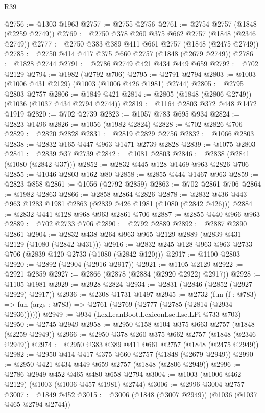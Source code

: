 \begin{lexlean}{R39}
\begin{coremodule}
@2756 := @1303 @1963
@2757 := @2755 @2756
@2761 := @2754 @2757 (@1848 (@2259 @2749))
@2769 := @2750 @378 @260 @375 @662 @2757 (@1848 (@2346 @2749))
@2777 := @2750 @383 @389 @411 @661 @2757 (@1848 (@2475 @2749))
@2785 := @2750 @414 @417 @375 @660 @2757 (@1848 (@2679 @2749))
@2786 := @1828 @2744
@2791 := @2786 @2749 @421 @434 @449 @659
@2792 := @702 @2129
@2794 := @1982 (@2792 @706)
@2795 := @2791 @2794
@2803 := @1003 (@1006 @431 @2129) (@1003 (@1006 @426 @1981) @2744)
@2805 := @2795 @2803 @2757
@2806 := @1849 @421
@2814 := @2805 (@1848 (@2806 @2749)) (@1036 (@1037 @434 @2794 @2744))
@2819 := @1164 @2803 @372 @448 @1472 @1919
@2820 := @702 @2739
@2823 := @1057 @783 @695 @934
@2824 := @2823 @1496
@2826 := @1056 (@1982 @2824)
@2828 := @702 @2826 @706
@2829 := @2820 @2828
@2831 := @2819 @2829 @2756
@2832 := @1066 @2803
@2838 := @2832 @165 @447 @963 @1471 @2739 @2828
@2839 := @1075 @2803
@2841 := @2839 @37 @2739
@2842 := @1081 @2803
@2846 := @2838 (@2841 (@1080 (@2842 @37)))
@2852 := @2832 @445 @128 @1469 @963 @2826 @706
@2855 := @1046 @2803 @162 @80
@2858 := @2855 @444 @1467 @963
@2859 := @2823 @858
@2861 := @1056 (@2792 @2859)
@2863 := @702 @2861 @706
@2864 := @1982 @2863
@2866 := @2858 @2864 @2826
@2878 := @2832 @436 @443 @963 @1283 @1981 @2863 (@2839 @426 @1981 (@1080 (@2842 @426)))
@2884 := @2832 @441 @128 @968 @963 @2861 @706
@2887 := @2855 @440 @966 @963
@2889 := @702 @2733 @706
@2890 := @2792 @2889
@2892 := @2887 @2890 @2861
@2904 := @2832 @438 @264 @963 @965 @2129 @2889 (@2839 @431 @2129 (@1080 (@2842 @431)))
@2916 := @2832 @245 @128 @963 @963 @2733 @706 (@2839 @120 @2733 (@1080 (@2842 @120)))
@2917 := @1100 @2803
@2920 := @2892 (@2904 (@2916 @2917))
@2921 := @1105 @2129
@2922 := @2921 @2859
@2927 := @2866 (@2878 (@2884 (@2920 @2922) @2917))
@2928 := @1105 @1981
@2929 := @2928 @2824
@2934 := @2831 (@2846 (@2852 (@2927 @2929) @2917))
@2936 := @2308 @1731 @1497
@2945 := @2732
    (fun (f : @783) => fun (args : @783) => @2761 (@2769 (@2777 (@2785 (@2814 (@2934 @2936))))))
@2949 := @934 (LexLeanBoot.LexiconLse.Lse.LPi @733 @703)
@2950 := @2745 @2949
@2958 := @2950 @158 @104 @375 @663 @2757 (@1848 (@2259 @2949))
@2966 := @2950 @378 @260 @375 @662 @2757 (@1848 (@2346 @2949))
@2974 := @2950 @383 @389 @411 @661 @2757 (@1848 (@2475 @2949))
@2982 := @2950 @414 @417 @375 @660 @2757 (@1848 (@2679 @2949))
@2990 := @2950 @421 @434 @449 @659 @2757 (@1848 (@2806 @2949))
@2996 := @2786 @2949 @452 @465 @480 @658 @2794
@3004 := @1003 (@1006 @462 @2129) (@1003 (@1006 @457 @1981) @2744)
@3006 := @2996 @3004 @2757
@3007 := @1849 @452
@3015 := @3006 (@1848 (@3007 @2949)) (@1036 (@1037 @465 @2794 @2744))

\end{coremodule}
\end{lexlean}
